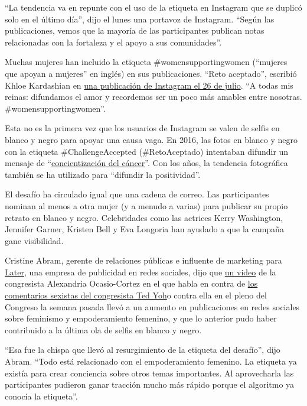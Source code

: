 ``La tendencia va en repunte con el uso de la etiqueta en Instagram que
se duplicó solo en el último día'', dijo el lunes una portavoz de
Instagram. ``Según las publicaciones, vemos que la mayoría de las
participantes publican notas relacionadas con la fortaleza y el apoyo a
sus comunidades''.

Muchas mujeres han incluido la etiqueta \#womensupportingwomen
(``mujeres que apoyan a mujeres'' en inglés) en sus publicaciones.
``Reto aceptado'', escribió Khloe Kardashian en
\href{https://www.instagram.com/p/CDH3xn1BB3W/}{una publicación de
Instagram el 26 de julio}. ``A todas mis reinas: difundamos el amor y
recordemos ser un poco más amables entre nosotras.
\#womensupportingwomen''.

Esta no es la primera vez que los usuarios de Instagram se valen de
selfis en blanco y negro para apoyar una causa vaga. En 2016, las fotos
en blanco y negro con la etiqueta \#ChallengeAccepted (\#RetoAceptado)
intentaban difundir un mensaje de
``\href{https://metro.co.uk/2016/08/29/what-is-the-black-and-white-photo-challenge-6097096/}{concientización
del cáncer}''. Con los años, la tendencia fotográfica también se ha
utilizado para ``difundir la positividad''.

El desafío ha circulado igual que una cadena de correo. Las
participantes nominan al menos a otra mujer (y a menudo a varias) para
publicar su propio retrato en blanco y negro. Celebridades como las
actrices Kerry Washington, Jennifer Garner, Kristen Bell y Eva Longoria
han ayudado a que la campaña gane visibilidad.

Cristine Abram, gerente de relaciones públicas e influente de marketing
para \href{https://later.com/}{Later}, una empresa de publicidad en
redes sociales, dijo que
\href{https://www.nytimes.com/2020/07/23/us/alexandria-ocasio-cortez-sexism-congress.html}{un
video} de la congresista Alexandria Ocasio-Cortez en el que habla en
contra de
\href{https://www.nytimes.com/es/2020/07/24/espanol/estados-unidos/alexandria-ocasio-cortez-insulto.html}{los
comentarios sexistas del congresista Ted Yoh}o contra ella en el pleno
del Congreso la semana pasada llevó a un aumento en publicaciones en
redes sociales sobre feminismo y empoderamiento femenino, y que lo
anterior pudo haber contribuido a la última ola de selfis en blanco y
negro.

``Esa fue la chispa que llevó al resurgimiento de la etiqueta del
desafío'', dijo Abram. ``Todo está relacionado con el empoderamiento
femenino. La etiqueta ya existía para crear conciencia sobre otros temas
importantes. Al aprovecharla las participantes pudieron ganar tracción
mucho más rápido porque el algoritmo ya conocía la etiqueta''.

